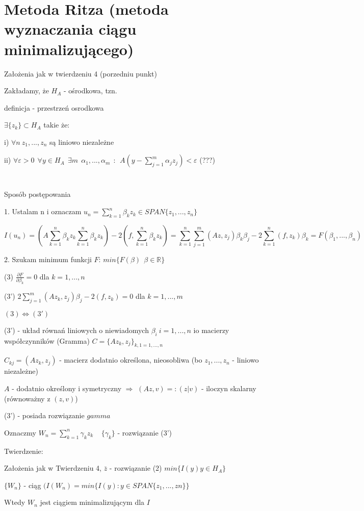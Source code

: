 \section{Metoda Ritza (metoda wyznaczania ciągu minimalizującego)}

Założenia jak w twierdzeniu 4 (porzedniu punkt)

Zakładamy, że $H_A$ - ośrodkowa, tzn.

definicja - przestrzeń osrodkowa

$\exists \{z_k\} \subset H_A$ takie że:

i) $\forall n\ z_1, ..., z_n$ są liniowo niezależne

ii) $\forall \varepsilon > 0\ \ \forall y \in H_A \ \ \exists m\ \ \alpha _1, ..., \alpha _m\ \ : \ \ A(y - \sum_{j=1}^{m} \alpha _j z_j) < \varepsilon$ (???)

$\ $

$\ $

Sposób postępowania

1. Ustalam n i oznaczam $u_n = \sum_{k=1}^{n} \beta _k z_k \in SPAN\{z_1, ..., z_n\}$

\[ I(u_n) = (A\sum_{k=1}^{n} \beta _k z_k \sum_{k=1}^{n} \beta _k z_k) - 2(f, \sum_{k=1}^{n} \beta _k z_k) = \sum_{k=1}^{n}\sum_{j=1}^{m} (Az,z_j) \beta _k \beta _j - 2\sum_{k=1}^{n} (f, z_k) \beta _k = F(\beta _1, ..., \beta _n)\]

2. Szukam minimum funkcji $F$: $min\{F(\beta)\ \ \beta \in \mathbb{R}\}$

(3) $\frac{\partial F}{\partial \beta _k} = 0$ dla $k = 1,...,n$

(3') $2 \sum_{j=1}^{m} (Az_k, z_j) \beta _j - 2(f, z_k) = 0$ dla $k = 1,...,m$

$ (3) \Leftrightarrow (3') $

(3') - układ równań liniowych o niewiadomych $\beta _i\ i = 1,...,n$ io macierzy współczynników (Gramma) $C = \{ Az_k, z_j \}_{k,1 = 1,...,n}$

$C_{kj} = (Az_k, z_j)$ - macierz dodatnio określona, nieosobliwa (bo $z_1,...,z_n$ - liniowo niezależne)

$A$ - dodatnio określony i symetryczny $\Rightarrow$ $(Az,v) =: (z|v)$ - iloczyn skalarny (równoważny z $(z,v)$)

(3') - posiada rozwiązanie $gamma$

Oznaczmy $W_n = \sum_{k=1}^{n} \gamma _k z_k\ \ \ \ \ \{\gamma _k\}$ - rozwiązanie (3')

Twierdzenie:

Założenia jak w Twierdzeniu 4, $\bar{z}$ - rozwiązanie (2) $ min\{ I(y) y \in H_A \}$

$\{W_n\}$ - ciąg $(I(W_n) = min\{I(y): y \in SPAN\{z_1,...,zn\}\}$

Wtedy ${W_n}$ jest ciągiem minimalizującym dla $I$

